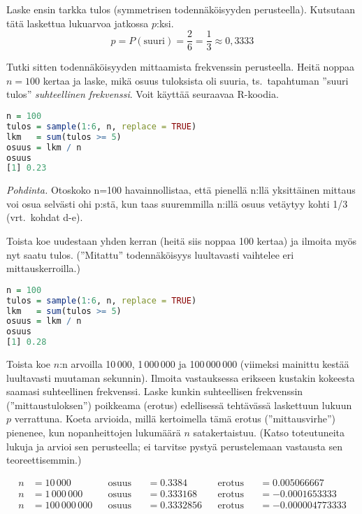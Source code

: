 \documentclass[12pt,a4paper]{article}
\begin{document}
\begin{kohta}
  \item Laske ensin tarkka tulos (symmetrisen 
  todennäköisyyden perusteella). Kutsutaan tätä laskettua 
  lukuarvoa jatkossa $p$:ksi.
  \[
  p = P(\text{suuri}) = \frac{2}{6} = \frac{1}{3} \approx 0{,}3333
  \]

  \item Tutki sitten todennäköisyyden mittaamista frekvenssin perusteella.
Heitä noppaa $n=100$ kertaa ja laske, mikä osuus tuloksista oli suuria,
ts.\ tapahtuman ''suuri tulos'' \emph{suhteellinen frekvenssi}. Voit käyttää 
seuraavaa R-koodia.

  \begin{lstlisting}[language=R]
n = 100
tulos = sample(1:6, n, replace = TRUE)
lkm   = sum(tulos >= 5)
osuus = lkm / n
osuus
[1] 0.23
  \end{lstlisting}
  \textit{Pohdinta.} Otoskoko n=100 havainnollistaa, 
  että pienellä n:llä yksittäinen mittaus voi osua 
  selvästi ohi p:stä, kun taas suuremmilla n:illä 
  osuus vetäytyy kohti 1/3 (vrt.\ kohdat d-e).

  \item Toista koe uudestaan yhden kerran (heitä siis noppaa 100 kertaa) ja ilmoita myös nyt saatu
tulos. (''Mitattu'' todennäköisyys luultavasti vaihtelee eri mittauskerroilla.)

  \begin{lstlisting}[language=R]
n = 100
tulos = sample(1:6, n, replace = TRUE)
lkm   = sum(tulos >= 5)
osuus = lkm / n
osuus
[1] 0.28
  \end{lstlisting}
\pagebreak



  \item Toista koe $n$:n arvoilla 10\,000, 1\,000\,000 ja 100\,000\,000
(viimeksi mainittu kestää luultavasti muutaman sekunnin). Ilmoita vastauksessa
erikseen kustakin kokeesta saamasi suhteellinen frekvenssi. Laske kunkin
suhteellisen frekvenssin (''mittaustuloksen'') poikkeama (erotus) edellisessä 
tehtävässä laskettuun lukuun $p$ verrattuna. Koeta arvioida, millä kertoimella
tämä erotus (''mittausvirhe'') pienenee, kun nopanheittojen lukumäärä $n$
satakertaistuu. (Katso toteutuneita lukuja ja arvioi sen perusteella; ei 
tarvitse pystyä perustelemaan vastausta sen teoreettisemmin.)


\[
\begin{aligned}
n &= 10\,000   && \text{osuus} &&= 0.3384    && \text{erotus} &&=  0.005066667 \\
n &= 1\,000\,000 && \text{osuus} &&= 0.333168  && \text{erotus} &&= -0.0001653333 \\
n &= 100\,000\,000 && \text{osuus} &&= 0.3332856 && \text{erotus} &&= -0.000004773333 \\
\end{aligned}
\]


\end{kohta}
\end{document}
